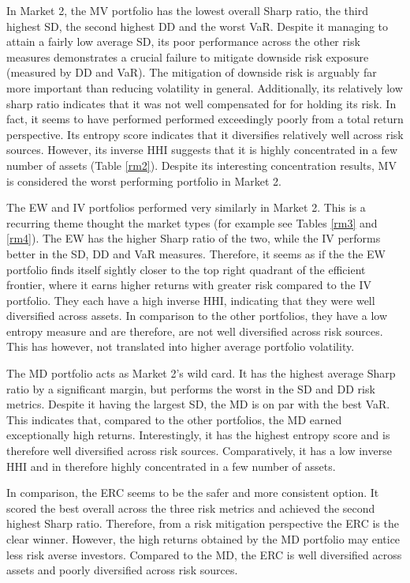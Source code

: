 \documentclass[11pt,preprint, authoryear]{elsarticle}
\numberwithin{equation}{section}
\numberwithin{figure}{section}
\numberwithin{table}{section}
\begin{document}
In Market 2, the MV portfolio has the lowest overall Sharp ratio, the
third highest SD, the second highest DD and the worst VaR. Despite it
managing to attain a fairly low average SD, its poor performance across
the other risk measures demonstrates a crucial failure to mitigate
downside risk exposure (measured by DD and VaR). The mitigation of
downside risk is arguably far more important than reducing volatility in
general. Additionally, its relatively low sharp ratio indicates that it
was not well compensated for for holding its risk. In fact, it seems to
have performed performed exceedingly poorly from a total return
perspective. Its entropy score indicates that it diversifies relatively
well across risk sources. However, its inverse HHI suggests that it is
highly concentrated in a few number of assets (Table \ref{rm2}). Despite
its interesting concentration results, MV is considered the worst
performing portfolio in Market 2.

The EW and IV portfolios performed very similarly in Market 2. This is a
recurring theme thought the market types (for example see Tables
\ref{rm3} and \ref{rm4}). The EW has the higher Sharp ratio of the two,
while the IV performs better in the SD, DD and VaR measures. Therefore,
it seems as if the the EW portfolio finds itself sightly closer to the
top right quadrant of the efficient frontier, where it earns higher
returns with greater risk compared to the IV portfolio. They each have a
high inverse HHI, indicating that they were well diversified across
assets. In comparison to the other portfolios, they have a low entropy
measure and are therefore, are not well diversified across risk sources.
This has however, not translated into higher average portfolio
volatility.

The MD portfolio acts as Market 2's wild card. It has the highest
average Sharp ratio by a significant margin, but performs the worst in
the SD and DD risk metrics. Despite it having the largest SD, the MD is
on par with the best VaR. This indicates that, compared to the other
portfolios, the MD earned exceptionally high returns. Interestingly, it
has the highest entropy score and is therefore well diversified across
risk sources. Comparatively, it has a low inverse HHI and in therefore
highly concentrated in a few number of assets.

In comparison, the ERC seems to be the safer and more consistent option.
It scored the best overall across the three risk metrics and achieved
the second highest Sharp ratio. Therefore, from a risk mitigation
perspective the ERC is the clear winner. However, the high returns
obtained by the MD portfolio may entice less risk averse investors.
Compared to the MD, the ERC is well diversified across assets and poorly
diversified across risk sources.
\end{document}
